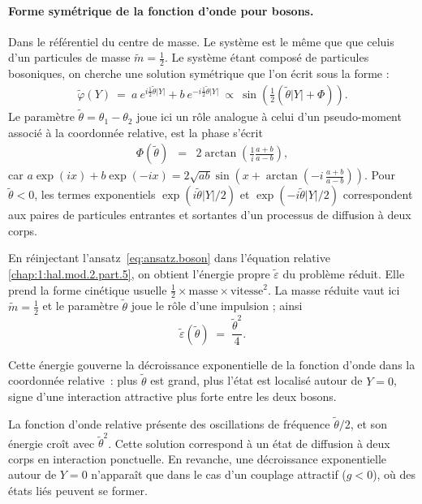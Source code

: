 \paragraph{Forme symétrique de la fonction d'onde pour bosons.}
Dans le référentiel du centre de masse. Le système est le même que que celuis d'un particules de masse $\tilde{m}= \frac{1}{2}$.
Le système étant composé de particules bosoniques, on cherche une solution symétrique que l’on écrit sous la forme  :
\begin{eqnarray}
	\tilde{\varphi}(Y) ~=~a~e^{i\frac{1}{2} \tilde{\theta} \vert Y \vert } + b~e^{-i\frac{1}{2} \tilde{\theta}\vert Y \vert } ~\propto~  \sin\left( \frac{1}{2} (\tilde{\theta} |Y| + \Phi ) \right). \label{eq:ansatz.boson}
\end{eqnarray}
Le paramètre \( \tilde{\theta} = \theta_1 - \theta_2 \) joue ici un rôle analogue à celui d’un pseudo-moment associé à la coordonnée relative,
est  la phase s'écrit
\begin{eqnarray}
	\Phi(\tilde{\theta}) &=& 2 \arctan\left (\frac{1}{i} \frac{a+b}{a-b}\right),	\label{chap:1:dif.mod.2.part.1} 
\end{eqnarray}
car \( a\exp(ix)+b\exp(-ix) = 2\sqrt{ab}\sin\left(x+\arctan\left(-i\, \frac{a+b}{a-b}\right)\right) \). Pour $\tilde{\theta}<0$, les termes exponentiels \( \exp(i\tilde{\theta} \vert Y \vert/2 ) \) et \( \exp(-i\tilde{\theta} \vert Y \vert/2 ) \) correspondent aux paires de particules entrantes et sortantes d’un processus de diffusion à deux corps.

En réinjectant l’ansatz~\eqref{eq:ansatz.boson} dans l’équation relative
\eqref{chap:1:hal.mod.2.part.5}, on obtient l’énergie propre
\(\tilde{\varepsilon}\) du problème réduit.  
Elle prend la forme cinétique usuelle
\(\tfrac{1}{2}\times\text{masse}\times\text{vitesse}^{2}\).  
La masse réduite vaut ici \(\tilde{m}= \frac{1}{2}\) et le paramètre
\(\tilde{\theta}\) joue le rôle d’une impulsion ; ainsi
\begin{equation}
   \tilde{\varepsilon}(\tilde{\theta})
   \;=\;\frac{\tilde{\theta}^{2}}{4}.
   \label{eq:energie_relative}
\end{equation}

Cette énergie gouverne la décroissance exponentielle de la fonction
d’onde dans la coordonnée relative : plus \(\tilde{\theta}\) est grand,
plus l’état est localisé autour de \(Y=0\), signe d’une interaction
attractive plus forte entre les deux bosons.

La fonction d’onde relative présente des oscillations de fréquence \(\tilde{\theta}/2\), et son énergie croît avec \(\tilde{\theta}^2\). Cette solution correspond à un état de diffusion à deux corps en interaction ponctuelle. En revanche, une décroissance exponentielle autour de $Y=0$ n’apparaît que dans le cas d’un couplage attractif ($g<0$), où des états liés peuvent se former.\\


